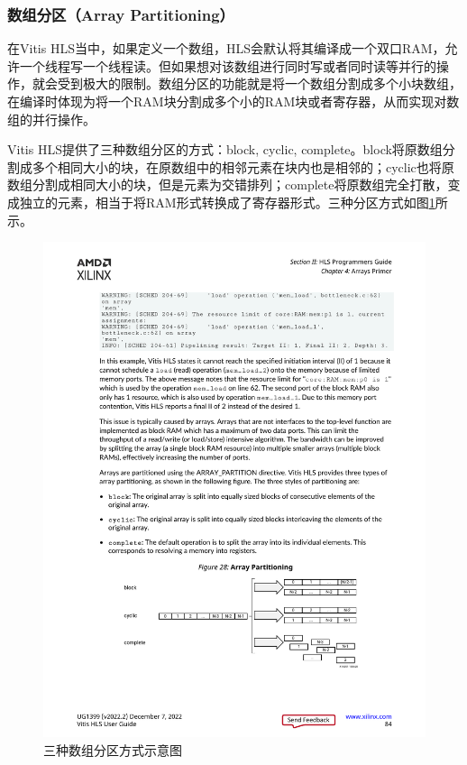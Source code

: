 \subsubsection{数组分区（Array Partitioning）}

在Vitis HLS当中，如果定义一个数组，HLS会默认将其编译成一个双口RAM，允许一个线程写一个线程读。但如果想对该数组进行同时写或者同时读等并行的操作，就会受到极大的限制。数组分区的功能就是将一个数组分割成多个小块数组，在编译时体现为将一个RAM块分割成多个小的RAM块或者寄存器，从而实现对数组的并行操作。

Vitis HLS提供了三种数组分区的方式：block, cyclic, complete。block将原数组分割成多个相同大小的块，在原数组中的相邻元素在块内也是相邻的；cyclic也将原数组分割成相同大小的块，但是元素为交错排列；complete将原数组完全打散，变成独立的元素，相当于将RAM形式转换成了寄存器形式。三种分区方式如图\ref{fig:array_partitioning}所示。

\begin{figure}[htbp]
    \centering
    \includegraphics[width=\linewidth]{figures/array_partitioning.pdf}
    \caption{三种数组分区方式示意图}
    \label{fig:array_partitioning}
\end{figure}

